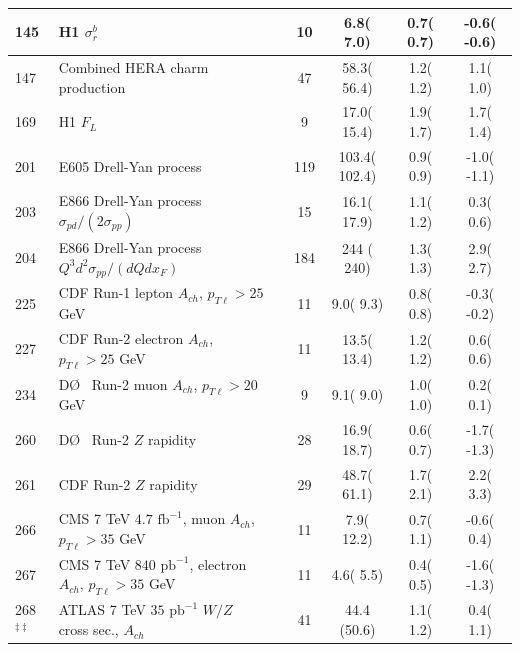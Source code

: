 \begin{table}[htbp]
\begin{tabular}{|l|lr|c|c|c|c|}
 145 & H1 $\sigma_{r}^{b}$                                                                 & \cite{Aktas:2004az}         &   10  &     6.8(   7.0) &   0.7( 0.7) &  -0.6( -0.6)   \tabularnewline\hline
 147 & Combined HERA charm production                                                      & \cite{Abramowicz:1900rp}    &   47  &    58.3(  56.4) &   1.2( 1.2) &   1.1(  1.0)   \tabularnewline\hline
 169 & H1 $F_{L}$                                                                          & \cite{Collaboration:2010ry} &    9  &    17.0(  15.4) &   1.9( 1.7) &   1.7(  1.4)   \tabularnewline\hline
 201 & E605 Drell-Yan process                                                              & \cite{Moreno:1990sf}        &  119  &   103.4( 102.4) &   0.9( 0.9) &  -1.0( -1.1)   \tabularnewline\hline
 203 & E866 Drell-Yan process  $\sigma_{pd}/(2\sigma_{pp})$                                & \cite{Towell:2001nh}        &   15  &    16.1(  17.9) &   1.1( 1.2) &   0.3(  0.6)   \tabularnewline\hline
 204 & E866 Drell-Yan process  $Q^3 d^2\sigma_{pp}/(dQ dx_F)$                              & \cite{Webb:2003ps}          &  184  &   244 ( 240) &   1.3( 1.3) &   2.9(  2.7)   \tabularnewline\hline
 225 & CDF Run-1 lepton $A_{ch}$, $p_{T\ell}>25$ GeV                                    & \cite{Abe:1998rv}           &   11  &     9.0(   9.3) &   0.8( 0.8) &  -0.3( -0.2)   \tabularnewline\hline
 227 & CDF Run-2 electron $A_{ch}$, $p_{T\ell}>25$ GeV                                     & \cite{Acosta:2005ud}        &   11  &    13.5(  13.4) &   1.2( 1.2) &   0.6(  0.6)   \tabularnewline\hline
 234 & D\O~ Run-2 muon $A_{ch}$, $p_{T\ell}>20$ GeV                                        & \cite{Abazov:2007pm}        &    9  &     9.1(   9.0) &   1.0( 1.0) &   0.2(  0.1)   \tabularnewline\hline
 260 & D\O~ Run-2 $Z$ rapidity                       &
 \cite{Abazov:2007jy}        &   28  &    16.9(  18.7) &   0.6( 0.7) &  -1.7( -1.3)   \tabularnewline\hline
 261 & CDF Run-2 $Z$ rapidity                                                              & \cite{Aaltonen:2010zza}     &   29  &    48.7(  61.1) &   1.7( 2.1) &   2.2(  3.3)   \tabularnewline\hline
 266 & CMS 7 TeV $4.7\mbox{ fb}^{-1}$, muon $A_{ch}$, $p_{T\ell}>35$ GeV                   & \cite{Chatrchyan:2013mza}   &   11  &     7.9(  12.2) &   0.7( 1.1) &  -0.6(  0.4)   \tabularnewline\hline
 267 & CMS 7 TeV $840\mbox{ pb}^{-1}$, electron $A_{ch}$, $p_{T\ell}>35$ GeV               & \cite{Chatrchyan:2012xt}    &   11  &    4.6(  5.5) &   0.4( 0.5) &   -1.6(  -1.3)   \tabularnewline\hline
 268$^{\ddagger\ddagger}$ & ATLAS 7 TeV $35\mbox{ pb}^{-1}$ $W/Z$ cross sec., $A_{ch}$                          & \cite{Aad:2011dm}           &   41  &    44.4   (50.6) &   1.1( 1.2) &   0.4(  1.1)   \tabularnewline\hline

\end{tabular}
\end{table}
